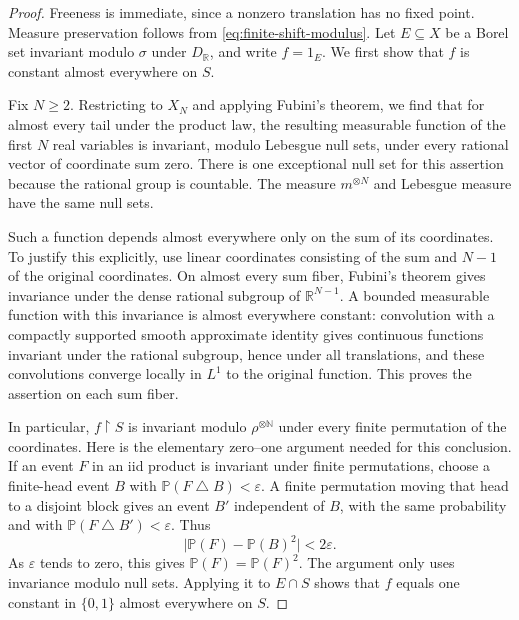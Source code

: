 \documentclass[11pt]{article}
\theoremstyle{definition}
\newcommand{\N}{\mathbb N}
\newcommand{\R}{\mathbb R}
\begin{document}
\begin{proof}
Freeness is immediate, since a nonzero translation has no fixed point.
Measure preservation follows from \eqref{eq:finite-shift-modulus}.
Let $E\subseteq X$ be a Borel set invariant modulo $\sigma$ under
$D_{\R}$, and write $f=1_E$. We first show that $f$ is constant almost
everywhere on $S$.

Fix $N\geq2$. Restricting to $X_N$ and applying Fubini's theorem, we find
that for almost every tail under the product law, the resulting measurable function of
the first $N$ real variables is invariant, modulo Lebesgue null sets,
under every rational vector of coordinate sum zero. There is one
exceptional null set for this assertion because the rational group is
countable. The measure $m^{\otimes N}$ and Lebesgue measure have the same
null sets.

Such a function depends almost everywhere only on the sum of its
coordinates. To justify this explicitly, use linear coordinates
consisting of the sum and $N-1$ of the original coordinates. On almost
every sum fiber, Fubini's theorem gives invariance under the dense
rational subgroup of $\R^{N-1}$. A bounded measurable function with
this invariance is almost everywhere constant: convolution with a
compactly supported smooth approximate identity gives continuous
functions invariant under the rational subgroup, hence under all
translations, and these convolutions converge locally in $L^1$ to the
original function. This proves the assertion on each sum fiber.

In particular, $f\mathbin{\upharpoonright}S$ is invariant modulo
$\rho^{\otimes\N}$ under every finite permutation of the coordinates.
Here is the elementary zero--one argument needed for this conclusion.
If an event $F$ in an iid product is invariant under finite permutations,
choose a finite-head event $B$ with
$\mathbb P(F\mathbin{\triangle}B)<\varepsilon$. A finite permutation
moving that head to a disjoint block gives an event $B'$ independent of
$B$, with the same probability and with
$\mathbb P(F\mathbin{\triangle}B')<\varepsilon$. Thus
\[
 \bigl|\mathbb P(F)-\mathbb P(B)^2\bigr|<2\varepsilon.
\]
As $\varepsilon$ tends to zero, this gives
$\mathbb P(F)=\mathbb P(F)^2$. The argument only uses invariance modulo
null sets. Applying it to $E\cap S$ shows that $f$ equals one constant
in $\{0,1\}$ almost everywhere on $S$.


\end{proof}
\end{document}

